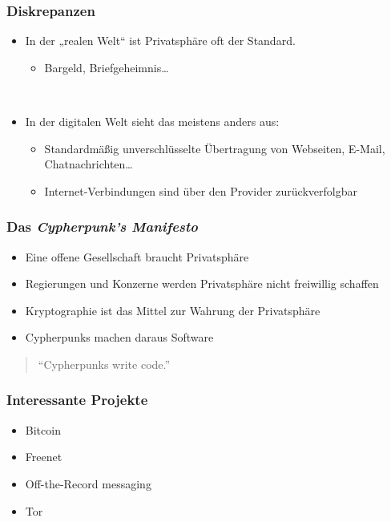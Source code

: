 \documentclass{beamer}
\begin{document}
\begin{frame}
\frametitle{Diskrepanzen}

	\begin{itemize}
		\item In der „realen Welt“ ist Privatsphäre oft der Standard.
		\begin{itemize}
			\item Bargeld, Briefgeheimnis…
		\end{itemize}
	
		\ \\
	
		\item In der digitalen Welt sieht das meistens anders aus:
		\begin{itemize}
			\item Standardmäßig unverschlüsselte Übertragung von Webseiten, E-Mail, Chatnachrichten\dots
			\item Internet-Verbindungen sind über den Provider zurückverfolgbar
		\end{itemize}
	\end{itemize}
\end{frame}

\begin{frame}
\frametitle{Das \textit{Cypherpunk’s Manifesto}}

	\begin{itemize}
		\item Eine offene Gesellschaft braucht Privatsphäre
		\item Regierungen und Konzerne werden Privatsphäre nicht freiwillig schaffen
		\item Kryptographie ist das Mittel zur Wahrung der Privatsphäre
		\item Cypherpunks machen daraus Software
	\end{itemize}

	\begin{quote}
		“Cypherpunks write code.”
	\end{quote}
\end{frame}

\begin{frame}
\frametitle{Interessante Projekte}

	\begin{itemize}
		\item Bitcoin
		\item Freenet
		\item Off-the-Record messaging
		\item Tor
	\end{itemize}
\end{frame}
\end{document}
